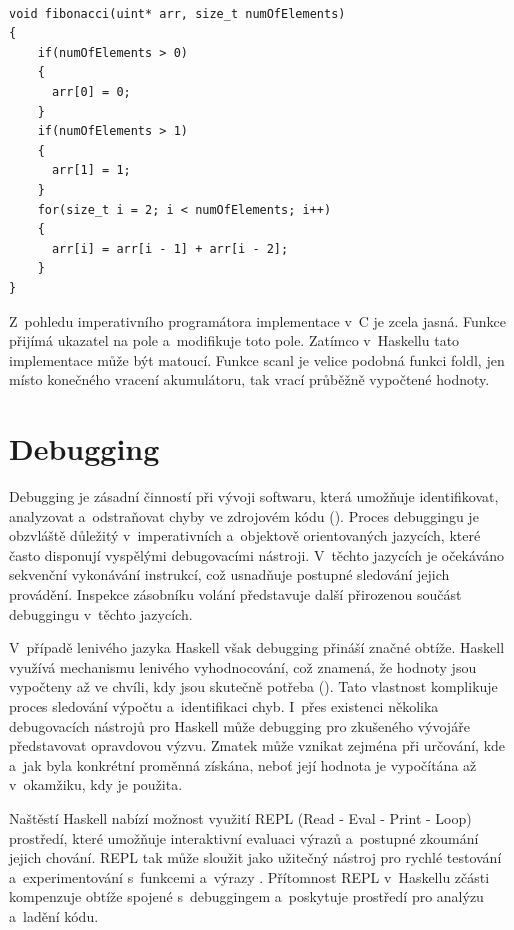 \documentclass[male, czech]{kithesis}
\newenvironment{code}{\captionsetup{type=listing}}{}
\begin{document}

\begin{code}
\begin{verbatim}

void fibonacci(uint* arr, size_t numOfElements)
{
    if(numOfElements > 0)
    {
      arr[0] = 0;
    }
    if(numOfElements > 1)
    {
      arr[1] = 1;
    }
    for(size_t i = 2; i < numOfElements; i++)
    {
      arr[i] = arr[i - 1] + arr[i - 2];
    }
}

\end{verbatim}
\end{code}

Z~pohledu imperativního programátora implementace v~C je zcela jasná. 
Funkce přijímá ukazatel na pole a~modifikuje toto pole. 
Zatímco v~Haskellu tato implementace může být matoucí. 
Funkce scanl je velice podobná funkci foldl, 
jen místo konečného vracení akumulátoru, 
tak vrací průběžně vypočtené hodnoty.

\section{Debugging}

Debugging je zásadní činností při vývoji softwaru, 
která umožňuje identifikovat, 
analyzovat a~odstraňovat chyby ve zdrojovém kódu (\cite{WhatIsDebugging}). 
Proces debuggingu je obzvláště důležitý v~imperativních a~objektově orientovaných jazycích, 
které často disponují vyspělými debugovacími nástroji.
V~těchto jazycích je očekáváno sekvenční vykonávání instrukcí, 
což usnadňuje postupné sledování jejich provádění. 
Inspekce zásobníku volání představuje 
další přirozenou součást debuggingu v~těchto jazycích.

V~případě lenivého jazyka Haskell však debugging přináší značné obtíže. 
Haskell využívá mechanismu lenivého vyhodnocování, což znamená, 
že hodnoty jsou vypočteny až ve chvíli, kdy jsou skutečně potřeba (\cite{HaskellDebugging}).
Tato vlastnost komplikuje proces sledování výpočtu a~identifikaci chyb. 
I~přes existenci několika debugovacích nástrojů pro Haskell může 
debugging pro zkušeného vývojáře představovat opravdovou výzvu. 
Zmatek může vznikat zejména při určování, 
kde a~jak byla konkrétní proměnná získána, 
neboť její hodnota je vypočítána až v~okamžiku, 
kdy je použita.

Naštěstí Haskell nabízí možnost využití REPL 
(Read - Eval - Print - Loop) prostředí, 
které umožňuje interaktivní evaluaci výrazů a~postupné zkoumání jejich chování. 
REPL tak může sloužit jako užitečný nástroj pro rychlé testování 
a~experimentování s~funkcemi a~výrazy \cite{HaskellGHCI}. 
Přítomnost REPL v~Haskellu zčásti kompenzuje obtíže spojené 
s~debuggingem a~poskytuje prostředí pro analýzu a~ladění kódu.
\end{document}
